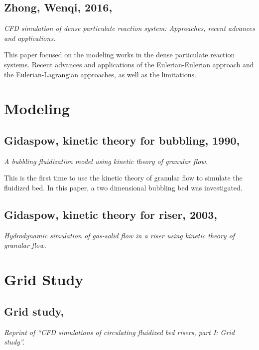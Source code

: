 \documentclass[11pt]{report}
\begin{document}
\subsection[Zhong, Wenqi, 2016]{Zhong, Wenqi, 2016, \cite{zhong2016cfd}}
\textit{CFD simulation of dense particulate reaction system: Approaches, recent advances and applications.}

This paper focused on the modeling works in the dense particulate reaction systems. 
Recent advances and applications of the Eulerian-Eulerian approach and the Eulerian-Lagrangian approaches, as well as the limitations.

\section{Modeling}
%
%
\subsection[Gidaspow, kinetic theory for bubbling, 1990]{Gidaspow, kinetic theory for bubbling, 1990, \cite{Ding1990}}
\textit{A bubbling fluidization model using kinetic theory of granular flow.}

This is the first time to use the kinetic theory of granular flow to simulate the fluidized bed. 
In this paper, a two dimensional bubbling bed was investigated. 

%
%
\subsection[Gidaspow, kinetic theory for riser, 2003]{Gidaspow, kinetic theory for riser, 2003, \cite{Huilin2003}}
\textit{Hydrodynamic simulation of gas-solid flow in a riser using kinetic theory of granular flow.}

\section{Grid Study}
%
%
\subsection[Grid study, 2014]{Grid study, \cite{Li2014}}
\textit{Reprint of ``CFD simulations of circulating fluidized bed risers, part I: Grid study''.}

%
%
\end{document}
